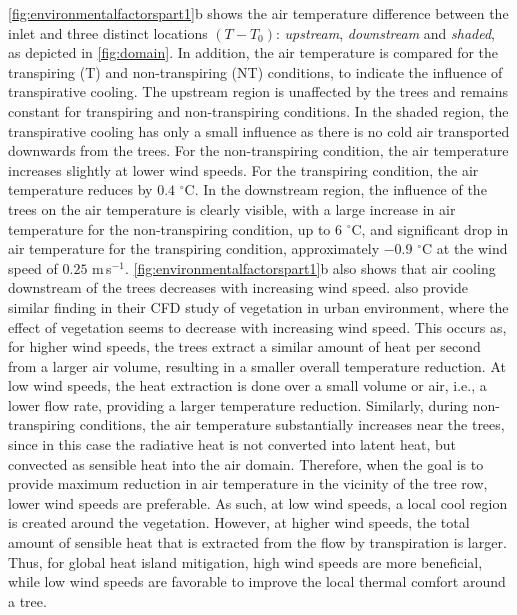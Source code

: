 \cref{fig:environmentalfactorspart1}b shows the air temperature difference between the inlet and three distinct locations $(T-T_0)$: \textit{upstream}, \textit{downstream} and \textit{shaded}, as depicted in \cref{fig:domain}. In addition, the air temperature is compared for the transpiring (T) and non-transpiring (NT) conditions, to indicate the influence of transpirative cooling. The upstream region is unaffected by the trees and remains constant for transpiring and non-transpiring conditions. In the shaded region, the transpirative cooling has only a small influence as there is no cold air transported downwards from the trees. For the non-transpiring condition, the air temperature increases slightly at lower wind speeds. For the transpiring condition, the air temperature reduces by $0.4$ $^{\circ}$C. In the downstream region, the influence of the trees on the air temperature is clearly visible, with a large increase in air temperature for the non-transpiring condition, up to 6 $^{\circ}$C, and significant drop in air temperature for the transpiring condition, approximately $-0.9$ $^{\circ}$C at the wind speed of $0.25$ m\,s$^{-1}$. \cref{fig:environmentalfactorspart1}b also shows that air cooling downstream of the trees decreases with increasing wind speed. \cite{Dimoudi2003} also provide similar finding in their CFD study of vegetation in urban environment, where the effect of vegetation seems to decrease with increasing wind speed. This occurs as, for higher wind speeds, the trees extract a similar amount of heat per second from a larger air volume, resulting in a smaller overall temperature reduction. At low wind speeds, the heat extraction is done over a small volume or air, i.e., a lower flow rate, providing a larger temperature reduction. Similarly, during non-transpiring conditions, the air temperature substantially increases near the trees, since in this case the radiative heat is not converted into latent heat, but convected as sensible heat into the air domain. Therefore, when the goal is to provide maximum reduction in air temperature in the vicinity of the tree row, lower wind speeds are preferable. As such, at low wind speeds, a local cool region is created around the vegetation. However, at higher wind speeds, the total amount of sensible heat that is extracted from the flow by transpiration is larger. Thus, for global heat island mitigation, high wind speeds are more beneficial, while low wind speeds are favorable to improve the local thermal comfort around a tree.

